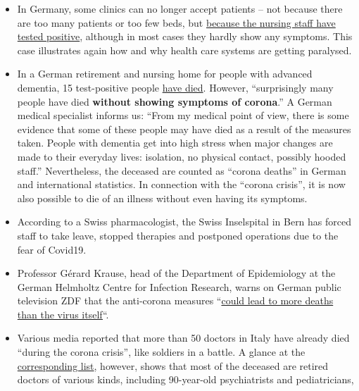 \begin{itemize}
\tightlist
\item
  In Germany, some clinics can no longer accept patients -- not because
  there are too many patients or too few beds, but
  \href{https://web.archive.org/web/20200330082928/https://www.sueddeutsche.de/panorama/coronavirus-news-deutschland-wolfsburg-laschet-1.4828033}{because
  the nursing staff have tested positive}, although in most cases they
  hardly show any symptoms. This case illustrates again how and why
  health care systems are getting paralysed.
\item
  In a German retirement and nursing home for people with advanced
  dementia, 15 test-positive people
  \href{https://web.archive.org/web/20200330082928/https://www.sueddeutsche.de/panorama/coronavirus-news-deutschland-wolfsburg-laschet-1.4828033}{have
  died}. However, ``surprisingly many people have died \textbf{without
  showing symptoms of corona}.'' A German medical specialist informs us:
  ``From my medical point of view, there is some evidence that some of
  these people may have died as a result of the measures taken. People
  with dementia get into high stress when major changes are made to
  their everyday lives: isolation, no physical contact, possibly hooded
  staff.'' Nevertheless, the deceased are counted as ``corona deaths''
  in German and international statistics. In connection with the
  ``corona crisis'', it is now also possible to die of an illness
  without even having its symptoms.
\item
  According to a Swiss pharmacologist, the Swiss Inselspital in Bern has
  forced staff to take leave, stopped therapies and postponed operations
  due to the fear of Covid19.
\item
  Professor Gérard Krause, head of the Department of Epidemiology at the
  German Helmholtz Centre for Infection Research, warns on German public
  television ZDF that the anti-corona measures
  ``\href{https://www.zdf.de/nachrichten/politik/coronavirus-epidemiologe-folgen-helmholtz-100.html}{could
  lead to more deaths than the virus itself}``.
\item
  Various media reported that more than 50 doctors in Italy have already
  died ``during the corona crisis'', like soldiers in a battle. A glance
  at the
  \href{https://web.archive.org/web/20200328152430/https://portale.fnomceo.it/elenco-dei-medici-caduti-nel-corso-dellepidemia-di-covid-19/}{corresponding
  list}, however, shows that most of the deceased are retired doctors of
  various kinds, including 90-year-old psychiatrists and pediatricians,

\end{itemize}
